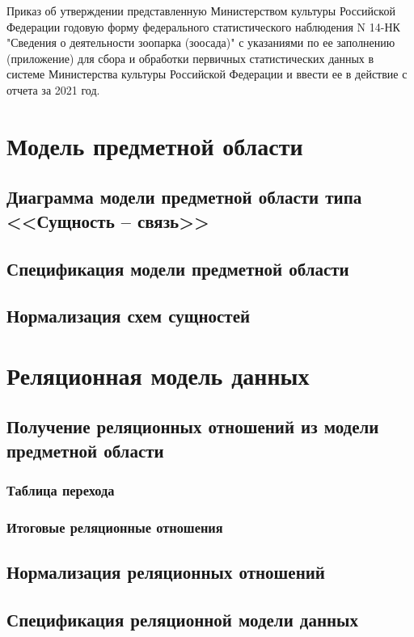 \documentclass[10pt, a4paper, titlepage]{article}
\begin{document}
Приказ об утверждении представленную Министерством культуры Российской Федерации годовую форму федерального статистического наблюдения N 14-НК "Сведения о деятельности зоопарка (зоосада)" с указаниями по ее заполнению (приложение) для сбора и обработки первичных статистических данных в системе Министерства культуры Российской Федерации и ввести ее в действие с отчета за 2021 год.

\section{Модель предметной области}

\subsection{Диаграмма модели предметной области типа <<Сущность -- связь>>}










\subsection{Спецификация модели предметной области}







\subsection{Нормализация схем сущностей}






\section{Реляционная модель данных}




\subsection{Получение реляционных отношений из модели предметной области}

\subsubsection{Таблица перехода}





\subsubsection{Итоговые реляционные отношения}




\subsection{Нормализация реляционных отношений}



\subsection{Спецификация реляционной модели данных}
\end{document}
